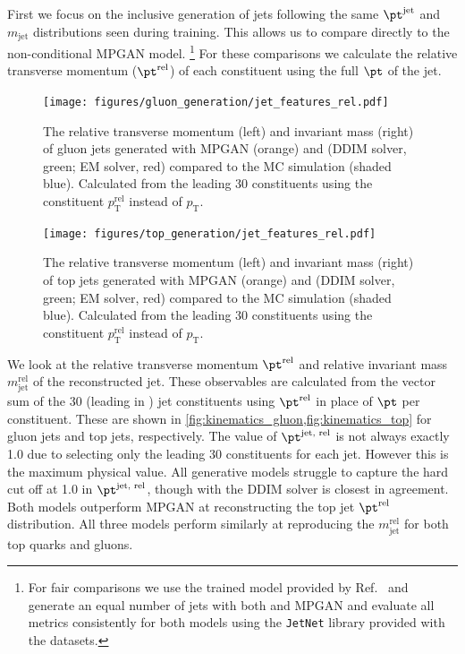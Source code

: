First we focus on the inclusive generation of jets following the same $\pt^\text{jet}$ and $m_\mathrm{jet}$ distributions seen during training.
This allows us to compare directly to the non-conditional MPGAN model.%
\footnote{For fair comparisons we use the trained model provided by Ref.~\cite{MPGAN} and generate an equal number of jets with both \pcjedi and MPGAN and evaluate all metrics consistently for both models using the \texttt{JetNet} library provided with the datasets.}
For these comparisons we calculate the relative transverse momentum ($\pt^\text{rel}$) of each constituent using the full $\pt$ of the jet.

\begin{figure}[hbpt]
    \centering
    \texttt{[image: figures/gluon\_generation/jet\_features\_rel.pdf]}
    \caption{The relative transverse momentum (left) and invariant mass (right) of gluon jets generated with MPGAN (orange) and \pcjedi (DDIM solver, green; EM solver, red) compared to the MC simulation (shaded blue).
    Calculated from the leading 30 \pt constituents using the constituent $p_\mathrm{T}^\mathrm{rel}$ instead of $p_\mathrm{T}$.}
    \label{fig:kinematics_gluon}
\end{figure}

\begin{figure}[hbpt]
    \centering
    \texttt{[image: figures/top\_generation/jet\_features\_rel.pdf]}
    \caption{The relative transverse momentum (left) and invariant mass (right) of top jets generated with MPGAN (orange) and \pcjedi (DDIM solver, green; EM solver, red) compared to the MC simulation (shaded blue).
    Calculated from the leading 30 \pt constituents using the constituent $p_\mathrm{T}^\mathrm{rel}$ instead of $p_\mathrm{T}$.}
    \label{fig:kinematics_top}
\end{figure}

We look at the relative transverse momentum $\pt^{\text{rel}}$ and relative invariant mass $m_\mathrm{jet}^\text{rel}$ of the reconstructed jet.
These observables are calculated from the vector sum of the 30 (leading in \pt) jet constituents using $\pt^\text{rel}$ in place of $\pt$ per constituent.
These are shown in \cref{fig:kinematics_gluon,fig:kinematics_top} for gluon jets and top jets,   respectively.
The value of $\pt^\text{jet, rel}$ is not always exactly 1.0 due to selecting only the leading 30 constituents for each jet.
However this is the maximum physical value.
All generative models struggle to capture the hard cut off at 1.0 in $\pt^\text{jet, rel}$, though \pcjedi with the DDIM solver is closest in agreement.
Both \pcjedi models outperform MPGAN at reconstructing the top jet $\pt^\text{rel}$ distribution.
All three models perform similarly at reproducing the $m_\mathrm{jet}^{\text{rel}}$ for both top quarks and gluons.


